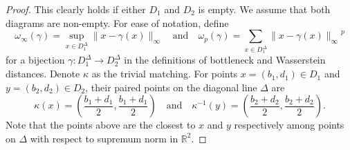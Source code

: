 \documentclass[10pt,a4paper]{amsart}
\begin{document}
\begin{proof}
	This clearly holds if either $D_1$ and $D_2$ is empty. We assume that both diagrams are non-empty. For ease of notation, define
	\begin{equation*}
		\omega_{\infty}(\gamma)=\sup _{x \in D_1^{\Delta}}\|x-\gamma(x)\|_{\infty} \quad \textrm{and} \quad \omega_p(\gamma)=\sum_{x \in D_1^{\Delta}}{\|x-\gamma(x)\|_\infty}^p
	\end{equation*}
	for a bijection $\gamma: D_1^{\Delta} \rightarrow D_2^{\Delta}$ in the definitions of bottleneck and Wasserstein distances. Denote $\kappa$ as the trivial matching. For points $x=(b_1, d_1) \in D_1$ and $y=(b_2, d_2) \in D_2$, their paired points on the diagonal line $\Delta$ are
	\begin{equation*}
		\kappa(x)=\left(\frac{b_1+d_1}{2}, \frac{b_1+d_1}{2}\right) \quad \textrm{and} \quad \kappa^{-1}(y)=\left(\frac{b_2+d_2}{2}, \frac{b_2+d_2}{2}\right).
	\end{equation*}
	Note that the points above are the closest to $x$ and $y$ respectively among points on $\Delta$ with respect to supremum norm in $\mathbb{R}^2$.
	

\end{proof}
\end{document}
